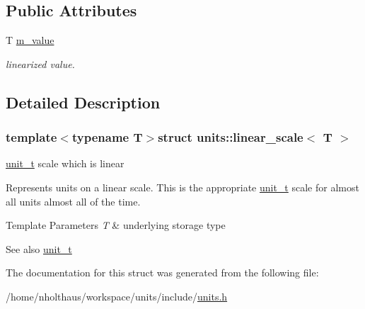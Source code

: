 \subsection*{Public Attributes}
\begin{DoxyCompactItemize}
\item 
\hypertarget{structunits_1_1linear__scale_a46d98f82582a5043fc2743e8cfed4e05}{}T \hyperlink{structunits_1_1linear__scale_a46d98f82582a5043fc2743e8cfed4e05}{m\+\_\+value}\label{structunits_1_1linear__scale_a46d98f82582a5043fc2743e8cfed4e05}

\begin{DoxyCompactList}\small\item\em linearized value. \end{DoxyCompactList}\end{DoxyCompactItemize}


\subsection{Detailed Description}
\subsubsection*{template$<$typename T$>$struct units\+::linear\+\_\+scale$<$ T $>$}

\hyperlink{classunits_1_1unit__t}{unit\+\_\+t} scale which is linear 

Represents units on a linear scale. This is the appropriate \hyperlink{classunits_1_1unit__t}{unit\+\_\+t} scale for almost all units almost all of the time. 
\begin{DoxyTemplParams}{Template Parameters}
{\em T} & underlying storage type \\
\hline
\end{DoxyTemplParams}
\begin{DoxySeeAlso}{See also}
\hyperlink{classunits_1_1unit__t}{unit\+\_\+t} 
\end{DoxySeeAlso}


The documentation for this struct was generated from the following file\+:\begin{DoxyCompactItemize}
\item 
/home/nholthaus/workspace/units/include/\hyperlink{units_8h}{units.\+h}\end{DoxyCompactItemize}
